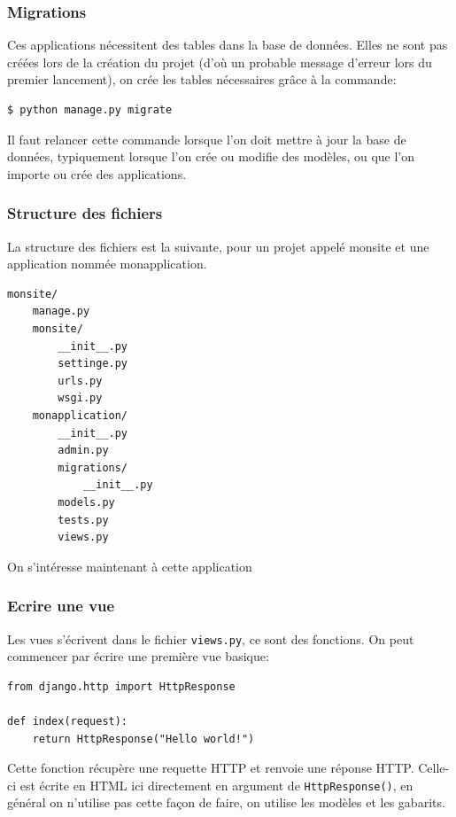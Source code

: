\documentclass[a4paper, 10pt]{article}
\newcommand{\code}[1]{{\small\texttt{#1}}}
\begin{document}
\subsubsection{Migrations}

Ces applications nécessitent des tables dans la base de données. Elles ne sont pas créées lors de la création du projet (d'où un probable message d'erreur lors du premier lancement), on crée les tables nécessaires grâce à la commande:
\begin{verbatim}
$ python manage.py migrate
\end{verbatim}

Il faut relancer cette commande lorsque l'on doit mettre à jour la base de données, typiquement lorsque l'on crée ou modifie des modèles, ou que l'on importe ou crée des applications.

\subsubsection{Structure des fichiers}
La structure des fichiers est la suivante, pour un projet appelé monsite et une application nommée monapplication.

\begin{verbatim}
monsite/
    manage.py
    monsite/
        __init__.py
        settinge.py
        urls.py
        wsgi.py
    monapplication/
        __init__.py
        admin.py
        migrations/
            __init__.py
        models.py
        tests.py
        views.py
\end{verbatim}

On s'intéresse maintenant à cette application

\subsubsection{Ecrire une vue}
Les vues s'écrivent dans le fichier \code{views.py}, ce sont des fonctions. On peut commencer par écrire une première vue basique:

\begin{verbatim}
from django.http import HttpResponse

def index(request):
    return HttpResponse("Hello world!")
\end{verbatim}

Cette fonction récupère une requette HTTP et renvoie une réponse HTTP. Celle-ci est écrite en HTML ici directement en argument de \code{HttpResponse()}, en général on n'utilise pas cette façon de faire, on utilise les modèles et les gabarits.
\end{document}
